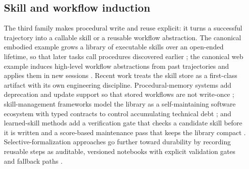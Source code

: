 \subsection{Skill and workflow induction}

The third family makes procedural write and reuse explicit: it turns a successful trajectory into a callable skill or a reusable workflow abstraction. The canonical embodied example grows a library of executable skills over an open-ended lifetime, so that later tasks call procedures discovered earlier \citep{wang2023voyageropenendedembodiedagent}; the canonical web example induces high-level workflow abstractions from past trajectories and applies them in new sessions \citep{wang2024agentworkflowmemory}. Recent work treats the skill store as a first-class artifact with its own engineering discipline. Procedural-memory systems add deprecation and update support so that stored workflows are not write-once \citep{fang2026mempexploringagentprocedural}; skill-management frameworks model the library as a self-maintaining software ecosystem with typed contracts to control accumulating technical debt \citep{pu2026skillops}; and learned-skill methods add a verification gate that checks a candidate skill before it is written and a score-based maintenance pass that keeps the library compact \citep{mi2026skillpro}. Selective-formalization approaches go further toward durability by recording reusable steps as auditable, versioned notebooks with explicit validation gates and fallback paths \citep{elhattami2026skillnb}.

